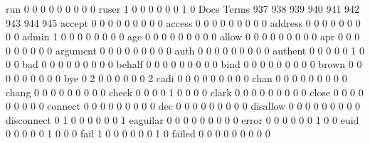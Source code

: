 \documentclass[compress,8pt]{beamer}
\begin{document}
\begin{frame}
\begin{Schunk}
  run                                        0   0   0   0   0   0   0   0   0
  ruser                                      1   0   0   0   0   0   0   1   0
                                          Docs
Terms                                      937 938 939 940 941 942 943 944 945
  accept                                     0   0   0   0   0   0   0   0   0
  access                                     0   0   0   0   0   0   0   0   0
  address                                    0   0   0   0   0   0   0   0   0
  admin                                      1   0   0   0   0   0   0   0   0
  age                                        0   0   0   0   0   0   0   0   0
  allow                                      0   0   0   0   0   0   0   0   0
  apr                                        0   0   0   0   0   0   0   0   0
  argument                                   0   0   0   0   0   0   0   0   0
  auth                                       0   0   0   0   0   0   0   0   0
  authent                                    0   0   0   0   0   1   0   0   0
  bad                                        0   0   0   0   0   0   0   0   0
  behalf                                     0   0   0   0   0   0   0   0   0
  bind                                       0   0   0   0   0   0   0   0   0
  brown                                      0   0   0   0   0   0   0   0   0
  bye                                        0   2   0   0   0   0   0   0   2
  cadi                                       0   0   0   0   0   0   0   0   0
  chan                                       0   0   0   0   0   0   0   0   0
  chang                                      0   0   0   0   0   0   0   0   0
  check                                      0   0   0   0   1   0   0   0   0
  clark                                      0   0   0   0   0   0   0   0   0
  close                                      0   0   0   0   0   0   0   0   0
  connect                                    0   0   0   0   0   0   0   0   0
  dec                                        0   0   0   0   0   0   0   0   0
  disallow                                   0   0   0   0   0   0   0   0   0
  disconnect                                 0   1   0   0   0   0   0   0   1
  eaguilar                                   0   0   0   0   0   0   0   0   0
  error                                      0   0   0   0   0   0   1   0   0
  euid                                       0   0   0   0   0   1   0   0   0
  fail                                       1   0   0   0   0   0   0   1   0
  failed                                     0   0   0   0   0   0   0   0   0

\end{Schunk}
\end{frame}
\end{document}
